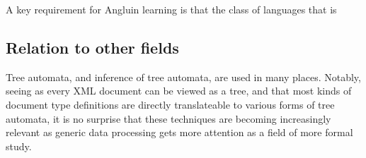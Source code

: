 A key requirement for Angluin learning is that the class of languages that
is 




\subsection{Relation to other fields}

Tree automata, and inference of tree automata, are used in many places.
Notably, seeing as every XML document can be viewed as a tree, and that
most kinds of document type definitions are directly translateable to
various forms of tree automata, it is no surprise that these techniques are
becoming increasingly relevant as generic data processing gets more
attention as a field of more formal study.





